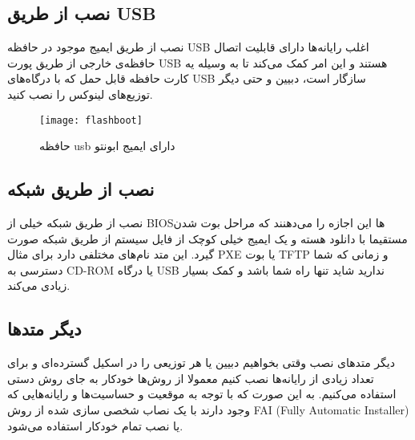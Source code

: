 \subsection{نصب از طریق USB}
\begin{frame}{نصب از طریق ایمیج موجود در حافظه USB}
  اغلب رایانه‌ها دارای قابلیت اتصال حافظه‌ی خارجی از طریق پورت USB هستند و این امر کمک می‌کند تا به وسیله یه کارت حافظه قابل حمل که با درگاه‌های USB سازگار است، دبیین و حتی دیگر توزیع‌های لینوکس را نصب کنید.
\begin{figure}
  \centering
  \texttt{[image: flashboot]}
  \caption{حافظه usb دارای ایمیج ابونتو~\cite{fig:usb_bootable}}
\end{figure}
\end{frame}

\subsection{نصب از طریق شبکه}
\begin{frame}{نصب از طریق شبکه}
  خیلی از BIOS‌ها این اجازه را می‌دهنند که مراحل بوت شدن مستقیما با دانلود هسته و یک ایمیج خیلی کوچک از فایل سیستم‌ از طریق شبکه صورت گیرد.
  این متد نام‌های مختلفی دارد برای مثال PXE یا بوت TFTP و زمانی که شما دسترسی به CD-ROM یا درگاه USB ندارید شاید تنها راه شما باشد و کمک بسیار زیادی می‌کند.\\
\end{frame}

\subsection{دیگر متدها}
\begin{frame}{دیگر متدهای نصب}
  وقتی بخواهیم دبیین یا هر توزیعی را در اسکیل گسترده‌ای و برای تعداد زیادی از رایانه‌ها نصب کنیم  معمولا از روش‌ها خودکار به جای روش دستی استفاده می‌کنیم.
به این صورت که با توجه به موقعیت و حساسیت‌ها و رایانه‌هایی که وجود دارند با یک نصاب شخصی سازی شده از روش FAI (Fully Automatic Installer) یا نصب تمام خودکار استفاده می‌شود.
\end{frame}

